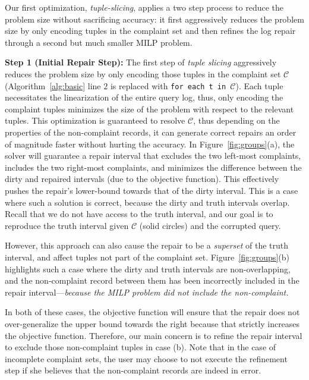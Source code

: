Our first optimization, \emph{tuple-slicing}, applies a two step process to reduce the 
problem size without sacrificing accuracy: it
first aggressively reduces
the problem size by only encoding tuples in the complaint set and then refines the log repair 
through a second but much smaller MILP problem. 

\smallskip
\noindent\textbf{Step 1 (Initial Repair Step):}
The first step of  \emph{tuple slicing} 
aggressively reduces the problem size by only encoding those 
tuples in the complaint set $\mathcal{C}$ (Algorithm~\ref{alg:basic} line $2$
is replaced with \texttt{for each t in $\mathcal{C}$}). 
Each tuple necessitates
the linearization of the entire query log, thus, only encoding the complaint tuples minimizes the 
size of the problem with respect to the relevant tuples. 
This optimization is guaranteed to resolve $\mathcal{C}$, thus depending on the properties of the non-complaint records, it can generate correct repairs
an order of magnitude faster without hurting the accuracy. 
In Figure~\ref{fig:groups}(a),
the solver will guarantee a repair interval that excludes the two left-most complaints, includes the two right-most complaints,
and minimizes the difference between the dirty and repaired intervals (due to the objective function).
This effectively pushes the repair's lower-bound towards that of the dirty interval.
This is a case where such a solution is correct, because the dirty and truth intervals overlap.
Recall that we do not have access to the truth interval, and our goal is to reproduce the truth interval given $\mathcal{C}$ (solid circles) and the corrupted query.

However, this approach can also cause the repair to be a {\it superset} of the truth interval, and affect tuples not part of the complaint set.
Figure~\ref{fig:groups}(b) highlights such a case where the dirty and truth intervals are non-overlapping, and the non-complaint record between them has been incorrectly included in the repair interval---\emph{because the MILP problem did not include the non-complaint.}





\indent In both of these cases, the objective function will ensure that the repair
does not over-generalize the upper bound towards the right because that strictly increases the objective function.
Therefore, our main concern is to refine the repair interval to exclude those non-complaint tuples in case (b).
Note that in the case of incomplete complaint sets, the user may choose to not execute the refinement step if she believes
that the non-complaint records are indeed in error.

